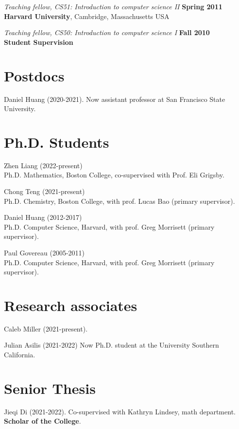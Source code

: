\documentclass[margin,line]{res}
\begin{document}
\begin{resume}
{\em Teaching fellow, CS51: Introduction to computer science II} \hfill {\bf Spring 2011}\\
{\bf Harvard University}, Cambridge, Massachusetts USA

\vspace{-.4cm}
{\em Teaching fellow, CS50: Introduction to computer science I} \hfill {\bf Fall 2010}\\


\newpage
  {\bf {\Large Student Supervision}}

\section{\sc Postdocs}

Daniel Huang (2020-2021). \hfill Now assistant professor at San Francisco State University.

\section{\sc Ph.D. Students}

Zhen Liang (2022-present)\\
Ph.D. Mathematics, Boston College, co-supervised with Prof. Eli Grigsby.

Chong Teng (2021-present)\\
Ph.D. Chemistry, Boston College, with prof. Lucas Bao (primary supervisor).

Daniel Huang (2012-2017)\\
Ph.D. Computer Science, Harvard, with prof. Greg Morrisett (primary supervisor). 

Paul Govereau (2005-2011)\\
Ph.D. Computer Science, Harvard, with prof. Greg Morrisett (primary supervisor). 

\section{\sc Research associates}

Caleb Miller (2021-present).

Julian Asilis (2021-2022) \hfill Now Ph.D. student at the University Southern California.

\section{\sc Senior Thesis}

Jieqi Di (2021-2022). Co-supervised with Kathryn Lindsey, math department. {\bf Scholar of the College}.


\end{resume}
\end{document}
